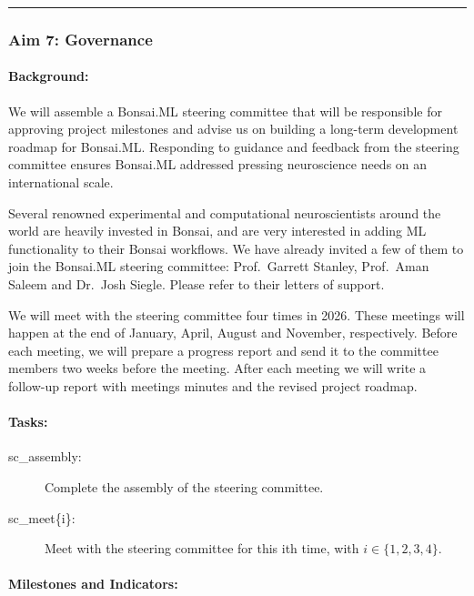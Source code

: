 \noindent\rule{\textwidth}{1pt}
\subsubsection{Aim 7: Governance}

\paragraph{Background:} We will assemble a Bonsai.ML steering committee that
will be responsible for approving project milestones and advise us on building
a long-term development roadmap for Bonsai.ML.  Responding to guidance and
feedback from the steering committee ensures Bonsai.ML addressed pressing
neuroscience needs on an international scale.

Several renowned experimental and computational neuroscientists around the
world are heavily invested in Bonsai, and are very interested in adding ML
functionality to their Bonsai workflows. We have already invited a few of them
to join the Bonsai.ML steering committee: Prof.~Garrett Stanley, Prof.~Aman
Saleem and Dr.~Josh Siegle. Please refer to their letters of support.

We will meet with the steering committee four times in 2026. These meetings
will happen at the end of January, April, August and November, respectively.
%
Before each meeting, we will prepare a progress report and send it to the
committee members two weeks before the meeting. After each meeting we will
write a follow-up report with meetings minutes and the revised project roadmap.

\paragraph{Tasks:}

\begin{description}

    \item[sc\_assembly:] Complete the assembly of the steering committee.

    \item[sc\_meet\{i\}:] Meet with the steering committee for this ith
        time, with $i\in\{1,2,3,4\}$.

\end{description}

\paragraph{Milestones and Indicators:}\mbox{}\\

